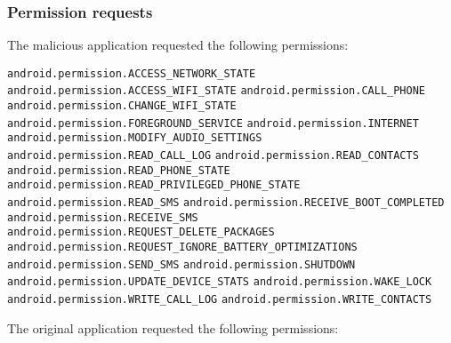 \subsubsection{Permission requests}
The malicious application requested the following permissions:

\texttt{android.permission.ACCESS\_NETWORK\_STATE}
\newline \texttt{android.permission.ACCESS\_WIFI\_STATE}
\newline \texttt{android.permission.CALL\_PHONE}
\newline \texttt{android.permission.CHANGE\_WIFI\_STATE}
\newline \texttt{android.permission.FOREGROUND\_SERVICE}
\newline \texttt{android.permission.INTERNET}
\newline \texttt{android.permission.MODIFY\_AUDIO\_SETTINGS}
\newline \texttt{android.permission.READ\_CALL\_LOG}
\newline \texttt{android.permission.READ\_CONTACTS}
\newline \texttt{android.permission.READ\_PHONE\_STATE}
\newline \texttt{android.permission.READ\_PRIVILEGED\_PHONE\_STATE}
\newline \texttt{android.permission.READ\_SMS}
\newline \texttt{android.permission.RECEIVE\_BOOT\_COMPLETED}
\newline \texttt{android.permission.RECEIVE\_SMS}
\newline \texttt{android.permission.REQUEST\_DELETE\_PACKAGES}
\newline \texttt{android.permission.REQUEST\_IGNORE\_BATTERY\_OPTIMIZATIONS}
\newline \texttt{android.permission.SEND\_SMS}
\newline \texttt{android.permission.SHUTDOWN}
\newline \texttt{android.permission.UPDATE\_DEVICE\_STATS}
\newline \texttt{android.permission.WAKE\_LOCK}
\newline \texttt{android.permission.WRITE\_CALL\_LOG}
\newline \texttt{android.permission.WRITE\_CONTACTS}

\newpage
{}
The original application requested the following permissions:

